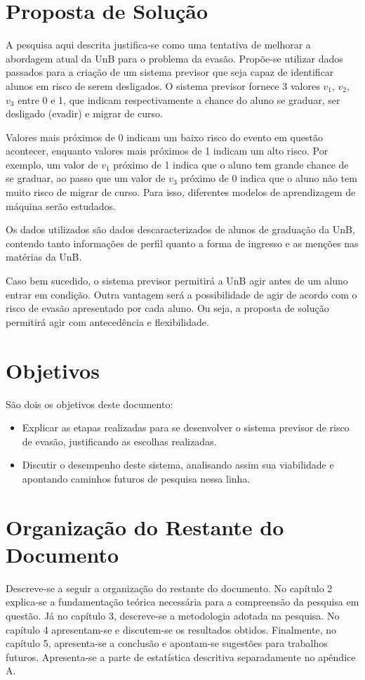 \section{Proposta de Solução}
    A pesquisa aqui descrita justifica-se como uma tentativa de melhorar a abordagem
    atual da UnB para o problema da evasão. Propõe-se utilizar dados passados para
    a criação de um sistema previsor que seja capaz de identificar alunos em risco de
    serem desligados. O sistema previsor fornece 3 valores $v_1$, $v_2$, $v_3$ entre 0
    e 1, que indicam respectivamente a chance do aluno se graduar, ser desligado (evadir)
    e migrar de curso. 
    \par Valores mais próximos de 0 indicam um baixo risco do evento em
    questão acontecer, enquanto valores mais próximos de 1 indicam um alto risco. Por
    exemplo, um valor de $v_1$ próximo de 1 indica que o aluno tem grande chance de se
    graduar, ao passo que um valor de $v_3$ próximo de 0 indica que o aluno não tem 
    muito risco de migrar de curso. Para isso, diferentes modelos de aprendizagem de
    máquina serão estudados. 
    \par Os dados utilizados são dados descaracterizados de alunos de
    graduação da UnB, contendo tanto informações de perfil quanto a forma de ingresso e
    as menções nas matérias da UnB. 
    \par Caso bem sucedido, o sistema previsor permitirá a
    UnB agir antes de um aluno entrar em condição. Outra vantagem será a possibilidade
    de agir de acordo com o risco de evasão apresentado por cada
    aluno. Ou seja, a proposta de solução permitirá agir com antecedência e
    flexibilidade. 

\section{Objetivos}
    São dois os objetivos deste documento: 
    \begin{itemize}
    \item Explicar as etapas realizadas para se desenvolver o sistema previsor de
        risco de evasão, justificando as escolhas realizadas.
    \item Discutir o desempenho deste sistema, analisando assim sua viabilidade e
        apontando caminhos futuros de pesquisa nessa linha.
\end{itemize}

\section{Organização do Restante do Documento}
\par Descreve-se a seguir a organização do restante do documento. 
No capítulo 2 explica-se a fundamentação teórica necessária para a compreensão da
pesquisa em questão. Já no capítulo 3, descreve-se a metodologia
adotada na pesquisa. No capítulo 4 apresentam-se e discutem-se os resultados
obtidos. Finalmente, no capítulo 5, apresenta-se a conclusão e apontam-se sugestões para
trabalhos futuros. Apresenta-se a parte de estatística descritiva separadamente no
apêndice A. 
